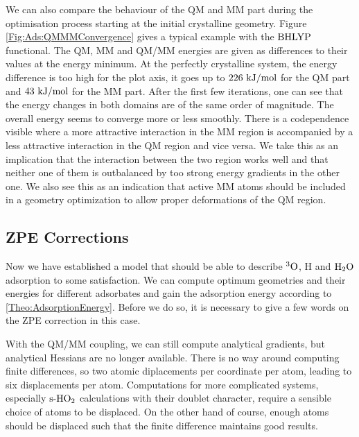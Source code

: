 \documentclass[8.5pt,twoside,twocolumn]{article}
\newcommand\sur{\enmat{\te{s-}}}
\newcommand\tripo{\enmat{{^3\te{O}}}}
\newcommand\kmo{\enmat{\te {kJ/mol}}}
\theoremstyle{standard}
\begin{document}
We can also compare the behaviour of the QM and MM part during the optimisation
process starting at the initial crystalline geometry. Figure \ref{Fig:Ads:QMMMConvergence}
gives a typical example with the $\text{BHLYP}$ functional. The QM, MM and
QM/MM energies are given as differences to their values at the energy minimum.
At the perfectly crystalline system, the energy difference is too high for the
plot axis, it goes up to $226~\kmo$ for the QM part and $43~\kmo$ for the MM part. 
After the first few iterations, one can see
that the energy changes in both domains are of the same order of magnitude. The
overall energy seems to converge more or less smoothly. There is a codependence
visible where a more attractive interaction in the MM region is accompanied by
a less attractive interaction in the QM region and vice versa. We take this as
an implication that the interaction between the two region works well and that
neither one of them is outbalanced by too strong energy gradients in the other
one. We also see this as an indication that active MM atoms should be included
in a geometry optimization to allow proper deformations of the QM region.

\subsection{ZPE Corrections}
\label{Sec:Ads:ZPE}

Now we have established a model that should be able to describe $\tripo$, 
H and $\text H _2 \text O$ adsorption to some satisfaction. We can compute optimum geometries
and their energies for different adsorbates and gain the adsorption energy
according to \eqref{Theo:AdsorptionEnergy}. Before we do so, it is necessary
to give a few words on the ZPE correction in this case.

With the QM/MM coupling, we can still compute analytical
gradients\cite{VersluisZiegler1988}, but analytical Hessians are
no longer available. There is no way around computing finite differences, so
two atomic diplacements per coordinate per atom, leading to six displacements
per atom. Computations for more complicated systems, especially $\sur\hot$
calculations with their doublet character, require a sensible choice of atoms
to be displaced. On the other hand of course, enough atoms should be displaced
such that the finite difference maintains good results.
\end{document}
